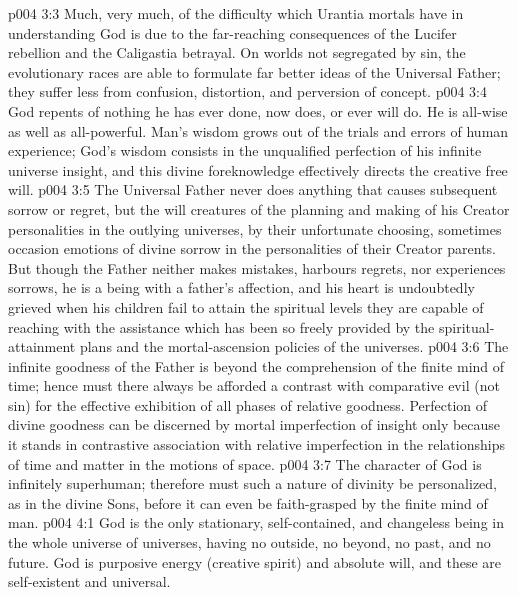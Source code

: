 \vs p004 3:3 \pc Much, very much, of the difficulty which Urantia mortals have in understanding God is due to the far\hyp{}reaching consequences of the Lucifer rebellion and the Caligastia betrayal. On worlds not segregated by sin, the evolutionary races are able to formulate far better ideas of the Universal Father; they suffer less from confusion, distortion, and perversion of concept.
\vs p004 3:4 \pc God repents of nothing he has ever done, now does, or ever will do. He is all\hyp{}wise as well as all\hyp{}powerful. Man’s wisdom grows out of the trials and errors of human experience; God’s wisdom consists in the unqualified perfection of his infinite universe insight, and this divine foreknowledge effectively directs the creative free will.
\vs p004 3:5 The Universal Father never does anything that causes subsequent sorrow or regret, but the will creatures of the planning and making of his Creator personalities in the outlying universes, by their unfortunate choosing, sometimes occasion emotions of divine sorrow in the personalities of their Creator parents. But though the Father neither makes mistakes, harbours regrets, nor experiences sorrows, he is a being with a father’s affection, and his heart is undoubtedly grieved when his children fail to attain the spiritual levels they are capable of reaching with the assistance which has been so freely provided by the spiritual\hyp{}attainment plans and the mortal\hyp{}ascension policies of the universes.
\vs p004 3:6 The infinite goodness of the Father is beyond the comprehension of the finite mind of time; hence must there always be afforded a contrast with comparative evil (not sin) for the effective exhibition of all phases of relative goodness. Perfection of divine goodness can be discerned by mortal imperfection of insight only because it stands in contrastive association with relative imperfection in the relationships of time and matter in the motions of space.
\vs p004 3:7 The character of God is infinitely superhuman; therefore must such a nature of divinity be personalized, as in the divine Sons, before it can even be faith\hyp{}grasped by the finite mind of man.
\vs p004 4:1 God is the only stationary, self\hyp{}contained, and changeless being in the whole universe of universes, having no outside, no beyond, no past, and no future. God is purposive energy (creative spirit) and absolute will, and these are self\hyp{}existent and universal.
